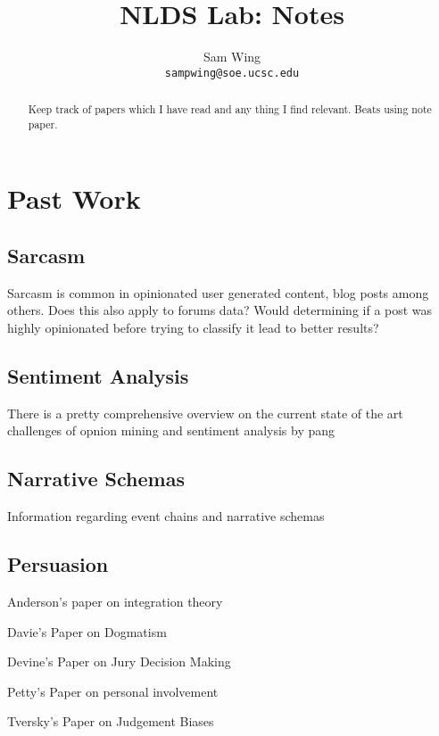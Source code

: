 \documentclass[11pt]{article}
\title{NLDS Lab: Notes}
\author{
	Sam Wing \\
	\texttt{sampwing@soe.ucsc.edu}
}
\date{}                                           %
\begin{document}
\maketitle

\begin{abstract}
Keep track of papers which I have read and any thing I find relevant.  Beats using note paper.
\end{abstract}

\section{Past Work}
\subsection{Sarcasm}
Sarcasm is common in opinionated user generated content, blog posts among others.\cite{icwsm} Does this also apply to forums data?  Would determining if a post was highly opinionated before trying to classify it lead to better results?
\subsection{Sentiment Analysis}
There is a pretty comprehensive overview on the current state of the art challenges of opnion mining and sentiment analysis by pang\cite{pang}

\subsection{Narrative Schemas}
Information regarding event chains\cite{chambers:eventchains} and narrative schemas\cite{chambers:schemas}

\subsection{Persuasion}
Anderson's paper on integration theory\cite{anderson:integrationtheory}

Davie's Paper on Dogmatism\cite{davies:dogmatism}

Devine's Paper on Jury Decision Making\cite{devine:jury}

Petty's Paper on personal involvement\cite{petty:personalinvolvement}

Tversky's Paper on Judgement Biases\cite{tversky:judgement}

\pagebreak


\end{document}
